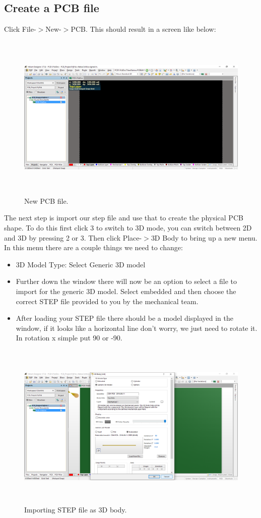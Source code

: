 \documentclass{article}
\begin{document}
	\subsection{Create a PCB file}
	Click File-$>$New-$>$PCB. This should result in a screen like below:
	
	\begin{figure}[H]	
		\centering
		\includegraphics[width=16cm, height=8cm]{new_pcb_file.png}
		\caption{New PCB file.}
		\label{fig 1}
	\end{figure}
	The next step is import our step file and use that to create the physical PCB shape. To do this first click 3 to switch to 3D mode, you can switch between 2D and 3D by pressing 2 or 3. Then click Place-$>$3D Body to bring up a new menu. In this menu there are a couple things we need to change:
	\begin{itemize}
		\item 3D Model Type: Select Generic 3D model
		\item Further down the window there will now be an option to select a file to import for the generic 3D model. Select embedded and then choose the correct STEP file provided to you by the mechanical team.
		\item After loading your STEP file there should be a model displayed in the window, if it looks like a horizontal line don't worry, we just need to rotate it. In rotation x simple put 90 or -90.
	\end{itemize}
	\begin{figure}[H]	
		\centering
		\includegraphics[width=16cm, height=8cm]{import_step.png}
		\caption{Importing STEP file as 3D body.}
		\label{fig 2}
	\end{figure}
\end{document}
